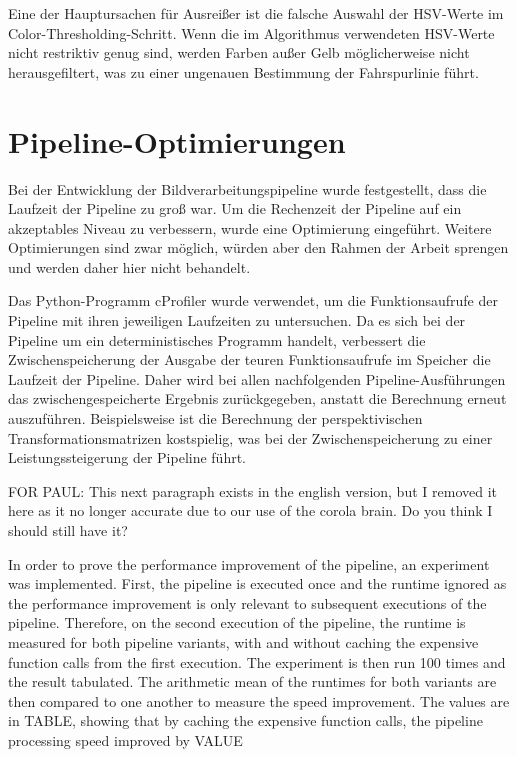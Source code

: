 \documentclass[arbeit=studie,oneside,BCOR=12mm]{ArbeitRST}
\begin{document}
Eine der Hauptursachen für Ausreißer ist die falsche Auswahl der HSV-Werte im Color-Thresholding-Schritt.
Wenn die im Algorithmus verwendeten HSV-Werte nicht restriktiv genug sind,
werden Farben außer Gelb möglicherweise nicht herausgefiltert, was zu einer
ungenauen Bestimmung der Fahrspurlinie führt.


\section{Pipeline-Optimierungen}

Bei der Entwicklung der Bildverarbeitungspipeline wurde festgestellt, dass die
Laufzeit der Pipeline zu gro{\ss} war. Um die Rechenzeit der Pipeline auf ein
akzeptables Niveau zu verbessern, wurde eine Optimierung eingeführt. Weitere
Optimierungen sind zwar möglich, würden aber den Rahmen der Arbeit sprengen und
werden daher hier nicht behandelt.

Das Python-Programm cProfiler wurde verwendet, um die Funktionsaufrufe der
Pipeline mit ihren jeweiligen Laufzeiten zu untersuchen. Da es sich bei der
Pipeline um ein deterministisches Programm handelt, verbessert die
Zwischenspeicherung der Ausgabe der teuren Funktionsaufrufe im Speicher die
Laufzeit der Pipeline. Daher wird bei allen nachfolgenden Pipeline-Ausführungen
das zwischengespeicherte Ergebnis zurückgegeben, anstatt die Berechnung erneut
auszuführen. Beispielsweise ist die Berechnung der perspektivischen
Transformationsmatrizen kostspielig, was bei der Zwischenspeicherung zu einer
Leistungssteigerung der Pipeline führt.

FOR PAUL: 
This next paragraph exists in the english version, but I removed it here as it
no longer accurate due to our use of the corola brain.
Do you think I should still have it?


In order to prove the performance improvement of the pipeline, an experiment
was implemented. First, the pipeline is executed once and the runtime ignored
as the performance improvement is only relevant to subsequent executions of the
pipeline. Therefore, on the second execution of the pipeline, the runtime is
measured for both pipeline variants, with and without caching the expensive
function calls from the first execution. The experiment is then run 100 times
and the result tabulated. The arithmetic mean of the runtimes for both variants
are then compared to one another to measure the speed improvement. The values
are in TABLE, showing that by caching the expensive function calls, the
pipeline processing speed improved by VALUE%
\end{document}
